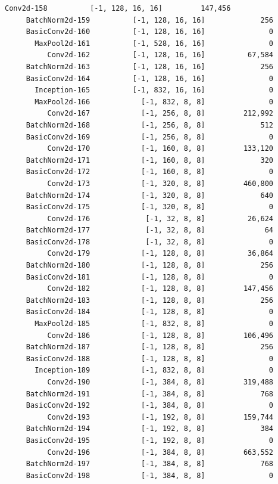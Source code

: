 \documentclass[a4paper, 12pt]{article}
\begin{document}
\begin{lstlisting}[language=sh]
          Conv2d-158          [-1, 128, 16, 16]         147,456
     BatchNorm2d-159          [-1, 128, 16, 16]             256
     BasicConv2d-160          [-1, 128, 16, 16]               0
       MaxPool2d-161          [-1, 528, 16, 16]               0
          Conv2d-162          [-1, 128, 16, 16]          67,584
     BatchNorm2d-163          [-1, 128, 16, 16]             256
     BasicConv2d-164          [-1, 128, 16, 16]               0
       Inception-165          [-1, 832, 16, 16]               0
       MaxPool2d-166            [-1, 832, 8, 8]               0
          Conv2d-167            [-1, 256, 8, 8]         212,992
     BatchNorm2d-168            [-1, 256, 8, 8]             512
     BasicConv2d-169            [-1, 256, 8, 8]               0
          Conv2d-170            [-1, 160, 8, 8]         133,120
     BatchNorm2d-171            [-1, 160, 8, 8]             320
     BasicConv2d-172            [-1, 160, 8, 8]               0
          Conv2d-173            [-1, 320, 8, 8]         460,800
     BatchNorm2d-174            [-1, 320, 8, 8]             640
     BasicConv2d-175            [-1, 320, 8, 8]               0
          Conv2d-176             [-1, 32, 8, 8]          26,624
     BatchNorm2d-177             [-1, 32, 8, 8]              64
     BasicConv2d-178             [-1, 32, 8, 8]               0
          Conv2d-179            [-1, 128, 8, 8]          36,864
     BatchNorm2d-180            [-1, 128, 8, 8]             256
     BasicConv2d-181            [-1, 128, 8, 8]               0
          Conv2d-182            [-1, 128, 8, 8]         147,456
     BatchNorm2d-183            [-1, 128, 8, 8]             256
     BasicConv2d-184            [-1, 128, 8, 8]               0
       MaxPool2d-185            [-1, 832, 8, 8]               0
          Conv2d-186            [-1, 128, 8, 8]         106,496
     BatchNorm2d-187            [-1, 128, 8, 8]             256
     BasicConv2d-188            [-1, 128, 8, 8]               0
       Inception-189            [-1, 832, 8, 8]               0
          Conv2d-190            [-1, 384, 8, 8]         319,488
     BatchNorm2d-191            [-1, 384, 8, 8]             768
     BasicConv2d-192            [-1, 384, 8, 8]               0
          Conv2d-193            [-1, 192, 8, 8]         159,744
     BatchNorm2d-194            [-1, 192, 8, 8]             384
     BasicConv2d-195            [-1, 192, 8, 8]               0
          Conv2d-196            [-1, 384, 8, 8]         663,552
     BatchNorm2d-197            [-1, 384, 8, 8]             768
     BasicConv2d-198            [-1, 384, 8, 8]               0

\end{lstlisting}
\end{document}
